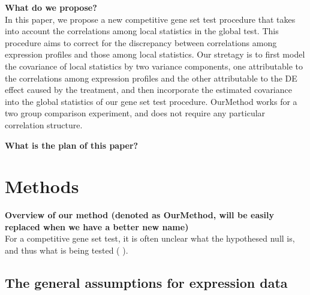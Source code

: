 \documentclass[11pt, a4paper]{article}
\begin{document}
	   
	
	\textbf{What do we propose?} \\
	In this paper, we propose a new competitive gene set test procedure that takes into account the correlations among local statistics in the global test. This procedure aims to correct for the discrepancy between correlations among expression profiles and those among local statistics. Our stretagy is to first model the covariance of local statistics by two variance components, one attributable to the correlations among expression profiles and the other attributable to the DE effect caused by the treatment, and then incorporate the estimated covariance into the global statistics of our gene set test procedure. OurMethod works for a two group comparison experiment, and does not require any particular correlation structure. 
		
	\textbf{What is the plan of this paper?} \\
	\section{Methods}\label{section:methods}
	\textbf{Overview of our method (denoted as OurMethod, will be easily replaced when we have a better new name)} \\
	For a competitive gene set test, it is often unclear what the hypothesed null is, and thus what is being tested (\cite{barry2008statistical}  \citealp{wu2012camera}).
	
	\subsection{The general assumptions for expression data}\label{subsection:assumption}
\end{document}

